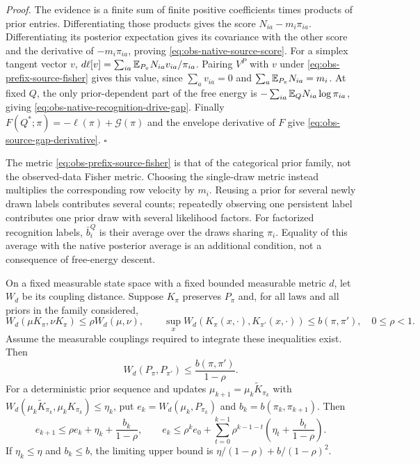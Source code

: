 \noindent\emph{Proof.}
The evidence is a finite sum of finite positive coefficients times products of
prior entries. Differentiating those products gives the score
$N_{ia}-m_i\pi_{ia}$. Differentiating its posterior expectation gives its
covariance with the other score and the derivative of $-m_i\pi_{ia}$, proving
\cref{eq:obs-native-source-score}. For a simplex tangent vector $v$,
$d\ell[v]=\sum_{ia}\mathbb E_{P_\pi}N_{ia}v_{ia}/\pi_{ia}$.
Pairing $V^P$ with $v$ under \cref{eq:obs-prefix-source-fisher} gives this value,
since $\sum_av_{ia}=0$ and $\sum_a\mathbb E_{P_\pi}N_{ia}=m_i$.
At fixed $Q$, the only prior-dependent part of the free energy is
$-\sum_{ia}\mathbb E_QN_{ia}\log\pi_{ia}$, giving \cref{eq:obs-native-recognition-drive-gap}.
Finally $F(Q^*;\pi)=-\ell(\pi)+\mathcal G(\pi)$ and the envelope derivative of
$F$ give \cref{eq:obs-source-gap-derivative}. $\square$

The metric \cref{eq:obs-prefix-source-fisher} is that of the categorical prior
family, not the observed-data Fisher metric. Choosing the single-draw metric
instead multiplies the corresponding row velocity by $m_i$. Reusing a prior
for several newly drawn labels contributes several counts; repeatedly observing
one persistent label contributes one prior draw with several likelihood factors.
For factorized recognition labels, $\bar b^Q_i$ is their average over the draws
sharing $\pi_i$. Equality of this average with the native posterior average is
an additional condition, not a consequence of free-energy descent.

On a fixed measurable state space with a fixed bounded measurable metric $d$,
let $W_d$ be its coupling distance. Suppose $K_\pi$ preserves $P_\pi$ and, for
all laws and all priors in the family considered,
\begin{equation}
W_d(\mu K_\pi,\nu K_\pi)\le\rho W_d(\mu,\nu),\qquad
\sup_xW_d(K_\pi(x,\cdot),K_{\pi'}(x,\cdot))\le b(\pi,\pi'),
\quad 0\le\rho<1.
\label{eq:obs-prior-kernel-hypotheses}
\end{equation}
Assume the measurable couplings required to integrate these inequalities
exist. Then
\begin{equation}
W_d(P_\pi,P_{\pi'})\le\frac{b(\pi,\pi')}{1-\rho}.
\label{eq:obs-prior-stationary-perturbation}
\end{equation}
For a deterministic prior sequence and updates
$\mu_{k+1}=\mu_k\widetilde K_{\pi_k}$ with
$W_d(\mu_k\widetilde K_{\pi_k},\mu_kK_{\pi_k})\le\eta_k$, put
$e_k=W_d(\mu_k,P_{\pi_k})$ and $b_k=b(\pi_k,\pi_{k+1})$. Then
\begin{equation}
e_{k+1}\le\rho e_k+\eta_k+\frac{b_k}{1-\rho},\qquad
e_k\le\rho^ke_0+\sum_{t=0}^{k-1}\rho^{k-1-t}
\left(\eta_t+\frac{b_t}{1-\rho}\right).
\label{eq:obs-moving-prior-tracking}
\end{equation}
If $\eta_k\le\eta$ and $b_k\le b$, the limiting upper bound is
$\eta/(1-\rho)+b/(1-\rho)^2$.

